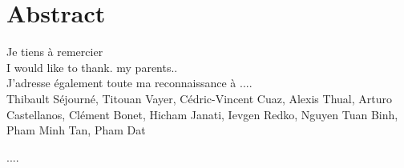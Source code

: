 \chapter*{Abstract}


Je tiens à remercier  \\
I would like to thank. my parents..\\
J'adresse également toute ma reconnaissance à .... \\

Thibault Séjourné, Titouan Vayer, Cédric-Vincent Cuaz,
Alexis Thual,
Arturo Castellanos,
Clément Bonet,
Hicham Janati,
Ievgen Redko,
Nguyen Tuan Binh,
Pham Minh Tan,
Pham Dat



....
